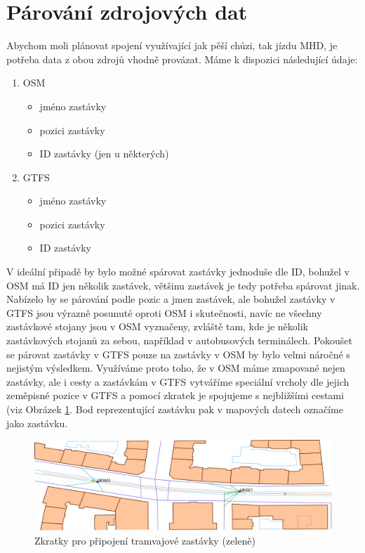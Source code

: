 \section{Párování zdrojových dat}
Abychom moli plánovat spojení využívající jak pěší chůzi, tak jízdu MHD, je
potřeba data z obou zdrojů vhodně provázat. Máme k dispozici následující údaje:
\begin{enumerate}
\item OSM
\begin{itemize}
	\item jméno zastávky
	\item pozici zastávky
	\item ID zastávky (jen u některých)
\end{itemize}
\item GTFS
\begin{itemize}
	\item jméno zastávky
	\item pozici zastávky
	\item ID zastávky
\end{itemize}
\end{enumerate} 
V ideální připadě by bylo možné spárovat zastávky jednoduše dle ID, bohužel v
OSM má ID jen několik zastávek, většinu zastávek je tedy potřeba spárovat jinak.
Nabízelo by se párování podle pozic a jmen zastávek, ale bohužel zastávky v GTFS
jsou výrazně posunuté oproti OSM i skutečnosti, navíc ne všechny zastávkové
stojany jsou v OSM vyznačeny, zvláště tam, kde je několik zastávkových stojanů
za sebou, například v autobusových terminálech. Pokoušet se párovat zastávky v
GTFS pouze na zastávky v OSM by bylo velmi náročné s nejistým výsledkem.
Využíváme proto toho, že v OSM máme zmapované nejen zastávky, ale i cesty a
zastávkám v GTFS vytváříme speciální vrcholy dle jejich zeměpisné pozice v GTFS
a pomocí zkratek je spojujeme s nejbližšími cestami (viz Obrázek
\ref{fig:zastavka}. Bod reprezentující zastávku pak v mapových datech označíme
jako zastávku.

\begin{figure}
  \centering
    \includegraphics[width=\textwidth]{../img/tramvaj.pdf}
  \caption{Zkratky pro připojení tramvajové zastávky (zeleně)}
  \label{fig:zastavka}
\end{figure}

